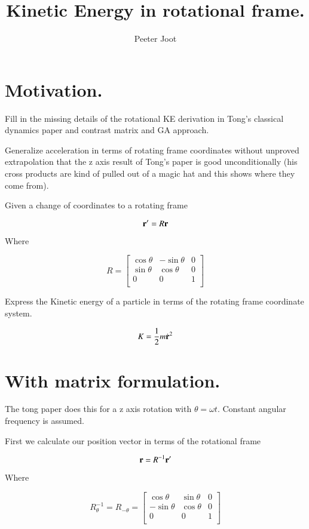 \documentclass{article}      %
\title{ Kinetic Energy in rotational frame. } %
\author{Peeter Joot}         %
\newcommand{\dt}[1]{\dot{#1}}
\begin{document}

\maketitle{}

\section{ Motivation. }

Fill in the missing details of the rotational KE derivation in Tong's classical
dynamics paper and contrast matrix and GA approach.

Generalize acceleration in terms
of rotating frame coordinates without unproved extrapolation that the z axis result
of Tong's paper is good unconditionally (his cross products are kind of pulled out of
a magic hat and this shows where they come from).

Given a change of coordinates to a rotating frame

\begin{equation}\label{eqn:rotcoord}
\mathbf{r}' = R \mathbf{r}
\end{equation}

Where

\[
R = 
\begin{bmatrix}
\cos \theta & -\sin \theta & 0 \\
\sin \theta & \cos \theta & 0 \\
0 & 0 & 1 \\
\end{bmatrix}
\]

Express the Kinetic energy of a particle in terms of the rotating frame
coordinate system.

\[
K = 
\inv{2} m \dt{\Br}^2 %
\]

\section{ With matrix formulation. }

The tong paper does this for a z axis rotation with $\theta = \omega t$.
Constant angular frequency is assumed.

First we calculate our position vector in terms of the rotational frame

\[
\mathbf{r} = R^{-1}\mathbf{r}'
\]

Where

\[
R_\theta^{-1} = R_{-\theta} =
\begin{bmatrix}
\cos \theta & \sin \theta & 0 \\
-\sin \theta & \cos \theta & 0 \\
0 & 0 & 1 \\
\end{bmatrix}
\]
\end{document}
